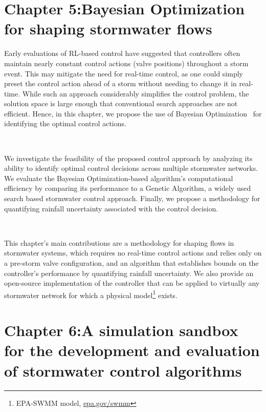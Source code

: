 \section{Chapter 5:Bayesian Optimization for shaping stormwater flows}

Early evaluations of RL-based control have suggested that controllers often maintain nearly constant control actions (valve positions) throughout a storm event.
This may mitigate the need for real-time control, as one could simply preset the control action ahead of a storm without needing to change it in real-time. 
While such an approach considerably simplifies the control problem, the solution space is large enough that conventional search approaches are not efficient.
Hence, in this chapter, we propose the use of Bayesian Optimization~\cite{frazier2018tutorial} for identifying the optimal control actions.

\

We investigate the feasibility of the proposed control approach by analyzing its ability to identify optimal control decisions across multiple stormwater networks.
We evaluate the Bayesian Optimization-based algorithm's computational efficiency by comparing its performance to a Genetic Algorithm, a widely used search based stormwater control approach.
Finally, we propose a methodology for quantifying rainfall uncertainty associated with the control decision. 

\

This chapter's main contributions are a methodology for shaping flows in stormwater systems, which requires no real-time control actions and relies only on a pre-storm valve configuration, and an algorithm that establishes bounds on the controller's performance by quantifying rainfall uncertainty. We also provide an open-source implementation of the controller that can be applied to virtually any stormwater network for which a physical model\footnote{EPA-SWMM model, \href{https://www.epa.gov/water-research/storm-water-management-model-swmm}{epa.gov/swmm}} exists.

\section[\texttt{pystorms}]{Chapter 6:A simulation sandbox for the development and evaluation of stormwater control algorithms}

